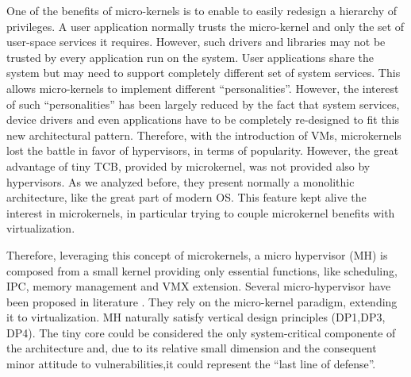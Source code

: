 \documentclass{sig-alternate}
\begin{document}
%
One of the benefits of micro-kernels is to enable to easily redesign a hierarchy of privileges. A user application normally trusts the micro-kernel and only the set of user-space services it requires. However, such drivers and libraries may not be trusted by every application run on the system. User applications share the system but may need to support completely different set of system services. This allows micro-kernels to implement different ``personalities''. However, the interest of such ``personalities'' has been largely reduced by the fact that system services, device drivers and even applications have to be completely re-designed to fit this new architectural pattern. Therefore, with the introduction of VMs, microkernels lost the battle in favor of hypervisors, in terms of popularity. However, the great advantage of tiny TCB, provided by microkernel, was not provided also by hypervisors. As we analyzed before, they present normally a monolithic architecture, like the great part of modern OS. This feature kept alive the interest in microkernels, in particular trying to couple microkernel benefits with virtualization\cite{Heiser}.

Therefore, leveraging this concept of microkernels, a micro hypervisor (MH) is composed from a small kernel providing only essential functions, like scheduling, IPC, memory management and VMX extension. Several micro-hypervisor have been proposed in literature \cite{xmhf, nova}. They rely on the micro-kernel paradigm, extending it to virtualization. MH naturally satisfy vertical design principles (DP1,DP3, DP4). The tiny core could be considered the only system-critical componente of the architecture and, due to its relative small dimension and the consequent minor attitude to vulnerabilities,it could represent the ``last line of defense''.
\end{document}

